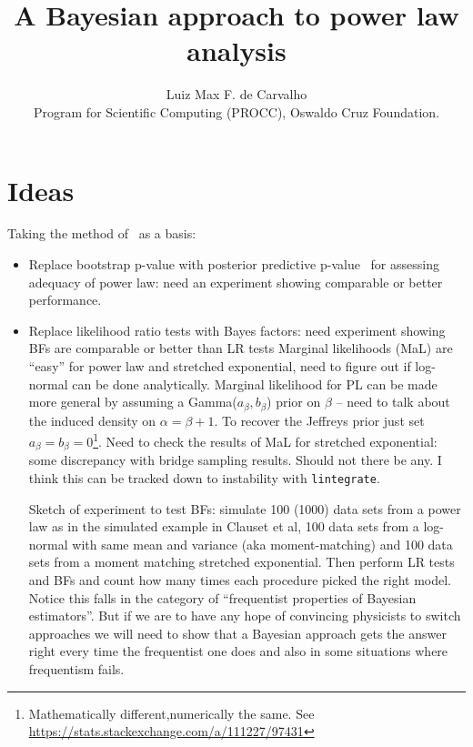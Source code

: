 \documentclass[a4paper, notitlepage, 10pt]{article}
\title{\vspace{-9ex}\centering \bf A Bayesian approach to power law analysis}
\author{
Luiz Max F. de Carvalho\\
Program for Scientific Computing (PROCC), Oswaldo Cruz Foundation. \\
}
\begin{document}
\maketitle

% 

\section{Ideas}
Taking the method of~\cite{Clauset2009} as a basis:
\begin{itemize}
 \item Replace bootstrap p-value with posterior predictive p-value~\citep{Gabry2017} for assessing adequacy of power law: need an experiment showing comparable or better performance.
 \item Replace likelihood ratio tests with Bayes factors: need experiment showing BFs are comparable or better than LR tests
 \subitem Marginal likelihoods (MaL) are ``easy'' for power law and stretched exponential, need to figure out if log-normal can be done analytically.
 Marginal likelihood for PL can be made more general by assuming a Gamma($a_\beta, b_\beta$) prior on $\beta$  -- need to talk about the induced density on $\alpha = \beta + 1$.
 To recover the Jeffreys prior just set $a_\beta = b_\beta = 0$\footnote{Mathematically different,numerically the same. See \url{https://stats.stackexchange.com/a/111227/97431}}.
 Need to check the results of MaL for stretched exponential: some discrepancy with bridge sampling results.
 Should not there be any.
 I think this can be tracked down to instability with \verb|lintegrate|.
 
 \subitem Sketch of experiment to test BFs: simulate 100 (1000) data sets from a power law as in the simulated example in Clauset et al, 100 data sets from a log-normal with same mean and variance (aka moment-matching) and 100 data sets from a moment matching stretched exponential.
 Then perform LR tests and BFs and count how many times each procedure picked the right model.
 Notice this falls in the category of ``frequentist properties of Bayesian estimators''. 
 But if we are to have any hope of convincing physicists to switch approaches we will need to show that a Bayesian approach gets the answer right every time the frequentist one does and also in some situations where frequentism fails. 
\end{itemize}
\end{document}
